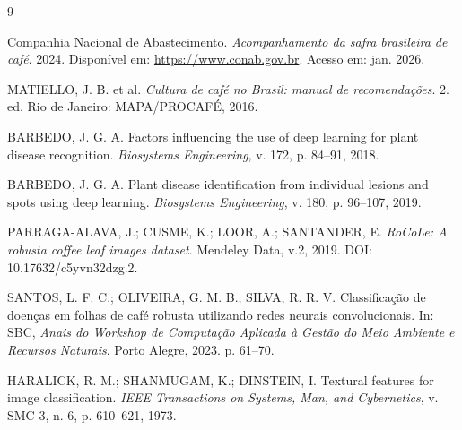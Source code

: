 \documentclass[11pt,a4paper]{article}
\begin{document}
\begin{thebibliography}{9}

Companhia Nacional de Abastecimento. \textit{Acompanhamento da safra brasileira de café}. 2024. Disponível em: \url{https://www.conab.gov.br}. Acesso em: jan. 2026.

MATIELLO, J. B. et al. \textit{Cultura de café no Brasil: manual de recomendações}. 2. ed. Rio de Janeiro: MAPA/PROCAFÉ, 2016.

BARBEDO, J. G. A. Factors influencing the use of deep learning for plant disease recognition. \textit{Biosystems Engineering}, v. 172, p. 84--91, 2018.

BARBEDO, J. G. A. Plant disease identification from individual lesions and spots using deep learning. \textit{Biosystems Engineering}, v. 180, p. 96--107, 2019.

PARRAGA-ALAVA, J.; CUSME, K.; LOOR, A.; SANTANDER, E. \textit{RoCoLe: A robusta coffee leaf images dataset}. Mendeley Data, v.2, 2019. DOI: 10.17632/c5yvn32dzg.2.

SANTOS, L. F. C.; OLIVEIRA, G. M. B.; SILVA, R. R. V. Classificação de doenças em folhas de café robusta utilizando redes neurais convolucionais. In: SBC, \textit{Anais do Workshop de Computação Aplicada à Gestão do Meio Ambiente e Recursos Naturais}. Porto Alegre, 2023. p. 61--70.

HARALICK, R. M.; SHANMUGAM, K.; DINSTEIN, I. Textural features for image classification. \textit{IEEE Transactions on Systems, Man, and Cybernetics}, v. SMC-3, n. 6, p. 610--621, 1973.

\end{thebibliography}
\end{document}
